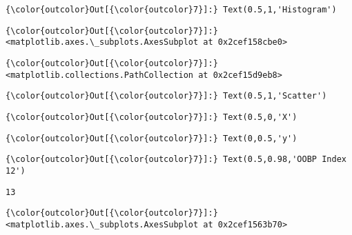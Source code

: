 \documentclass[11pt]{article}
\begin{document}
\begin{Verbatim}[commandchars=\\\{\}]
{\color{outcolor}Out[{\color{outcolor}7}]:} Text(0.5,1,'Histogram')
\end{Verbatim}
            
\begin{Verbatim}[commandchars=\\\{\}]
{\color{outcolor}Out[{\color{outcolor}7}]:} <matplotlib.axes.\_subplots.AxesSubplot at 0x2cef158cbe0>
\end{Verbatim}
            
\begin{Verbatim}[commandchars=\\\{\}]
{\color{outcolor}Out[{\color{outcolor}7}]:} <matplotlib.collections.PathCollection at 0x2cef15d9eb8>
\end{Verbatim}
            
\begin{Verbatim}[commandchars=\\\{\}]
{\color{outcolor}Out[{\color{outcolor}7}]:} Text(0.5,1,'Scatter')
\end{Verbatim}
            
\begin{Verbatim}[commandchars=\\\{\}]
{\color{outcolor}Out[{\color{outcolor}7}]:} Text(0.5,0,'X')
\end{Verbatim}
            
\begin{Verbatim}[commandchars=\\\{\}]
{\color{outcolor}Out[{\color{outcolor}7}]:} Text(0,0.5,'y')
\end{Verbatim}
            
\begin{Verbatim}[commandchars=\\\{\}]
{\color{outcolor}Out[{\color{outcolor}7}]:} Text(0.5,0.98,'OOBP Index 12')
\end{Verbatim}
            
    \begin{Verbatim}[commandchars=\\\{\}]
13

    \end{Verbatim}

\begin{Verbatim}[commandchars=\\\{\}]
{\color{outcolor}Out[{\color{outcolor}7}]:} <matplotlib.axes.\_subplots.AxesSubplot at 0x2cef1563b70>
\end{Verbatim}
            
\end{document}
